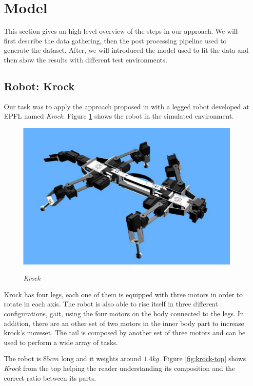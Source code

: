 \documentclass[../document.tex]{subfiles}
\begin{document}
\section{Model}
This section gives an high level overview of the steps in our approach. We will first describe the data gathering,  then the post processing pipeline used to generate the dataset. After, we will introduced the model used to fit the data and then show the results with different test environments.
\subsection{Robot: Krock}
Our task was to apply the approach proposed in \cite{omar@traversability} with a legged robot developed at EPFL named 
\emph{Krock}. Figure \ref{fig:krock} shows the robot in the simulated environment.
\begin{figure}[H]
    \centering
    \includegraphics[width=\linewidth]{../img/krock-1.jpg}
    \label{fig:krock}
    \caption{\emph{Krock}}
\end{figure}
Krock has four legs, each one of them is equipped with three motors in order to rotate in each axis. The robot is 
also able to rise itself in three different configurations, gait, using the four motors on the body connected 
to the legs. In addition, there are an other set of two motors in the inner body part to increase krock's moveset. 
The tail is composed by another set of three motors and can be used to perform a wide array of tasks.

The robot is $85cm$ long and it weights around $1.4kg$. Figure \ref{fig:krock-top} shows \emph{Krock} from the top helping the reader 
understanding its composition and the correct ratio between its parts.
\end{document}
